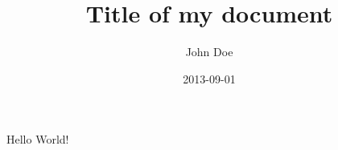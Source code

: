 \documentclass{article}
\title{Title of my document}
\date{2013-09-01}
\author{John Doe}
\begin{document}

\maketitle %
\newpage %

Hello World!
\end{document}
